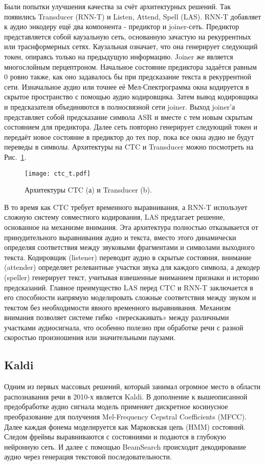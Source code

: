 Были попытки улучшения качества за счёт архитектурных решений.
Так появились Transducer (RNN-T)\cite{graves2012sequence} и Listen, Attend, Spell (LAS)\cite{chan2016listen}.
RNN-T добавляет к аудио энкодеру ещё два компонента - предиктор и joiner-сеть.
Предиктор представляется собой каузальную сеть, основанную зачастую на рекуррентных или траснформерных сетях.
Каузальная означает, что она генерирует следующий токен, опираясь только на предыдущую информацию.
Joiner же является многослойным перцептроном.
Начальное состояние предиктора задаётся равным 0 ровно также, как оно задавалось бы при предсказание текста в рекуррентной сети.
Изначальное аудио или точнее её Мел-Спектрограмма окна кодируется в скрытое пространство с помощью аудио кодировщика.
Затем вывод кодировщика и предсказателя объединяются в полносвязной сети joiner.
Выход joiner'а представляет собой предсказание символа ASR и вместе с тем новым скрытым состоянием для предиктора.
Далее сеть повторно генерирует следующий токен и передаёт новое состояние в предиктор до тех пор, пока все окна аудио не будут переведы в символы.
Архитектуры на CTC и Transducer можно посмотреть на Рис.~\ref{fig:ctc_t}.

\begin{figure}[!t]
  \centering
  \texttt{[image: ctc\_t.pdf]}
  \caption{Архитектуры CTC (а) и Transducer (b).}
  \label{fig:ctc_t}
\end{figure}

В то время как CTC требует временного выравнивания, а RNN-T использует сложную систему совместного кодирования, LAS предлагает решение, основанное на механизме внимания.
Эта архитектура полностью отказывается от принудительного выравнивания аудио и текста, вместо этого динамически определяя соответствия между звуковыми фрагментами и символами выходного текста.
Кодировщик (listener) переводит аудио в скрытые состояния, внимание (attender) определяет релевантные участки звука для каждого символа, а декодер (speller) генерирует текст, учитывая взвешенные вниманием признаки и историю предсказаний.
Главное преимущество LAS перед CTC и RNN-T заключается в его способности напрямую моделировать сложные соответствия между звуком и текстом без необходимости явного временного выравнивания.
Механизм внимания позволяет системе гибко «перескакивать» между различными участками аудиосигнала, что особенно полезно при обработке речи с разной скоростью произношения или значительными паузами.

\subsection{Kaldi}
Одним из первых массовых решений, который занимал огромное место в области распознавания речи в 2010-х является Kaldi\cite{povey2011kaldi}.
В дополнение к вышеописанной предобработке аудио сигнала модель применяет дискретное косинусное преобразование для получения Mel-Frequency Cepstral Coefficients (MFCC).
Далее каждая фонема моделируется как Марковская цепь (HMM) состояний.
Следом фреймы выравниваются с состояниями и подаются в глубокую нейронную сеть.
И далее с помощью BeamSearch происходит декодирование аудио через генерация текстовой последовательности.

